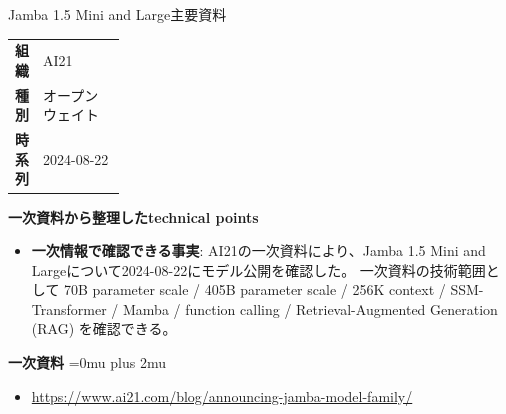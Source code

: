 \begin{technicalnote}{Jamba 1.5 Mini and Large}{主要資料}
\begingroup
\begin{tabularx}{\linewidth}{@{}>{\bfseries}p{0.22\linewidth}X@{}}
組織 & AI21 \\
種別 & オープンウェイト \\
時系列 & 2024-08-22 \\
\end{tabularx}
\smallskip
{\bfseries 一次資料から整理したtechnical points}
\begin{itemize}[leftmargin=1.5em,itemsep=0.35em]
\item \textbf{一次情報で確認できる事実}: AI21の一次資料により、Jamba 1.5 Mini and Largeについて2024-08-22にモデル公開を確認した。 一次資料の技術範囲として 70B parameter scale / 405B parameter scale / 256K context / SSM-Transformer / Mamba / function calling / Retrieval-Augmented Generation (RAG) を確認できる。
\end{itemize}
\begin{minipage}{\linewidth}
\begin{samepage}
{\bfseries 一次資料}
\begingroup\sloppy
\Urlmuskip=0mu plus 2mu\relax
\begin{itemize}[leftmargin=1.5em,itemsep=0.25em]
\item {\scriptsize\url{https://www.ai21.com/blog/announcing-jamba-model-family/}}
\end{itemize}
\endgroup
\end{samepage}
\end{minipage}
\endgroup
\end{technicalnote}
\medskip

